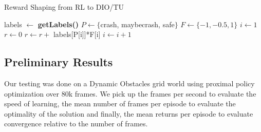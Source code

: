 \begin{algorithm}[H]
  \caption{Reward Shaping from RL to DIO/TU}
  \begin{algorithmic}[1]
      
      \State labels $\gets$ \textbf{getLabels()} 
      \State $P \gets \{$crash, maybecrash, safe$\}$  
      \State $F \gets \{-1,-0.5,1\}$ 
      \State $i \gets 1$
      \State $r \gets 0$
         \State $r \gets r +$ labels[P[i]]*F[i] 
         \State $i \gets i+1$


      \EndWhile
      
      \EndProcedure
      
      \end{algorithmic}
      \end{algorithm}

    \subsection{Preliminary Results}
    Our testing was done on a Dynamic Obstacles grid world using proximal policy optimization over 80k frames. 
    We pick up the frames per second to evaluate the speed of learning, the mean number of frames per episode 
    to evaluate the optimality of the solution and finally, the mean returns per episode to evaluate convergence relative 
    to the number of frames. 


